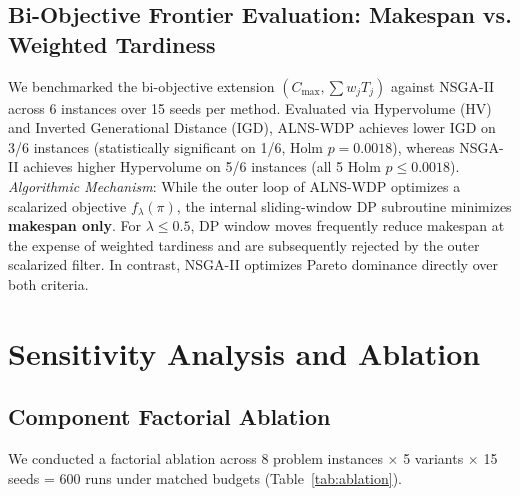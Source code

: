 \documentclass[journal]{IEEEtran}
\begin{document}
\subsection{Bi-Objective Frontier Evaluation: Makespan vs. Weighted Tardiness}
We benchmarked the bi-objective extension $(C_{\max}, \sum w_j T_j)$ against NSGA-II across 6 instances over 15 seeds per method. Evaluated via Hypervolume (HV) and Inverted Generational Distance (IGD), ALNS-WDP achieves lower IGD on 3/6 instances (statistically significant on 1/6, Holm $p = 0.0018$), whereas NSGA-II achieves higher Hypervolume on 5/6 instances (all 5 Holm $p \le 0.0018$).
\textit{Algorithmic Mechanism}: While the outer loop of ALNS-WDP optimizes a scalarized objective $f_\lambda(\pi)$, the internal sliding-window DP subroutine minimizes \textbf{makespan only}. For $\lambda \le 0.5$, DP window moves frequently reduce makespan at the expense of weighted tardiness and are subsequently rejected by the outer scalarized filter. In contrast, NSGA-II optimizes Pareto dominance directly over both criteria.

\section{Sensitivity Analysis and Ablation}
\label{sec:ablation}

\subsection{Component Factorial Ablation}
We conducted a factorial ablation across 8 problem instances $\times$ 5 variants $\times$ 15 seeds = 600 runs under matched budgets (Table~\ref{tab:ablation}).

\begin{table}[t]
\centering
\scriptsize
\setlength{\tabcolsep}{3pt}
\caption{Component Ablation Results (600 Runs across 8 Instances).}
\label{tab:ablation}

\end{table}
\end{document}
